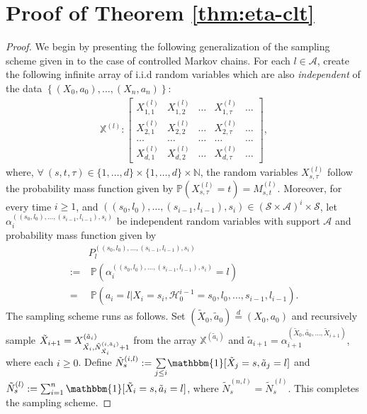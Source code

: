 \documentclass[twoside,11pt]{article}
\newcommand{\pow}[1]{^{(#1)}}%
\numberwithin{equation}{section}
\newcommand{\lp}{\left(}
\newcommand{\rp}{\right)}
\newcommand{\History}{\mathcal{H}}
\newcommand{\Pbb}{\mathbb{P}}
\newcommand{\Xbb}{\mathbb{X}}
\newcommand{\statespace}{\{1,\dots, d\}}
\newcommand{\indexeddata}{\left\{(X_0,a_0),\dots,(X_n,a_n)\right\}}
\newcommand{\prob}{\Pbb}
\newcommand{\indicator}{\mathbbm{1}}
\begin{document}
\section{Proof of Theorem \ref{thm:eta-clt}}
\label{sec:proof-eta-clt}
\begin{proof}
We begin by presenting the following generalization of the sampling scheme given in \cite{billingsley1961statistical} to the case of controlled Markov chains. 
For each $l \in \mathcal{A}$, create the following infinite array of i.i.d random variables which are also \emph{independent} of the data $\indexeddata$:
\begin{align}
    \Xbb^{(l)} : \left[ \begin{array}{ccccc}
        X_{1,1}^{(l)} & X_{1,2}^{(l)} & \dots & X_{1,\tau}^{(l)} & \dots \\
        X_{2,1}^{(l)} & X_{2,2}^{(l)} & \dots & X_{2,\tau}^{(l)} & \dots \\ 
         \dots &\dots &\dots &\dots & \dots \\
        X_{d,1}^{(l)} & X_{d,2}^{(l)} & \dots & X_{d,\tau}^{(l)} & \dots
    \end{array} \right],
    \nonumber
\end{align}
where, $\forall \ (s,t,\tau)\in \statespace \times \statespace \times \mathbb{N}$, the random variables $X_{s,\tau}^{(l)}$ follow the probability mass function given by $\prob (X_{s,\tau}^{(l)}=t)=M_{s,t}^{(l)}$.
Moreover, for every time $i\geq 1$, and $\lp(s_0,l_0),\dots,(s_{i-1},l_{i-1}),s_i\rp\in (\mathcal{S}\times\mathcal{A})^{i}\times \mathcal{S}$, let $\alpha_i\pow{(s_0,l_0),\dots,(s_{i-1},l_{i-1}),s_i}$ be independent random variables with support $\mathcal{A}$ and probability mass function given by
\begin{align*}
& P_l\pow{(s_0,l_0),\dots,(s_{i-1},l_{i-1}),s_i} \\
     := & \ \prob( \alpha_i\pow{(s_0,l_0),\dots,(s_{i-1},l_{i-1}),s_i}=l) \\
      = & \ \prob(a_i=l|X_i=s_i,\History_0^{i-1}=s_0,l_0,\dots,s_{i-1},l_{i-1}).
\end{align*}
The sampling scheme runs as follows. Set $(\tilde X_0,\tilde a_0)\overset{d}{=} (X_0,a_0)$ and recursively sample $\Tilde{X}_{i+1}= X_{\Tilde{X_i},\Tilde{N}_{\Tilde{X_i}}^{(i,\tilde a_i)}+1}\pow{\tilde a_i}$ from the array $\Xbb^{(\tilde a_{i})}$ and $\tilde a_{i+1}{=}\alpha_{i+1}\pow{\tilde X_0,\tilde{a_0},\dots,\tilde X_{i+1}}$, where each $i\geq 0$. 
Define $\tilde{N}_{s}\pow{i,l}:=\underset{j\leq i}{\sum}\indicator[\Tilde{X}_j=s,\tilde a_j=l]$ and $\tilde{N}_{s}\pow{l}:=\sum_{i=1}^{n} \indicator[\Tilde{X}_i=s,\tilde a_i=l]$, where $\tilde {N}_{s}\pow{n, l}=\tilde {N}_{s}\pow{l}$. 
This completes the sampling scheme.


\end{proof}
\end{document}
